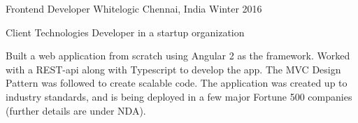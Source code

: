 

\begin{cventries}

  \cventry
    {Frontend Developer} %
    {Whitelogic} %
    {Chennai, India} %
    {Winter 2016} %
    {
      \begin{cvitems} %
      \item {Client Technologies Developer in a startup organization}
        \item {Built a web application from scratch using Angular 2 as the framework.
            Worked with a REST-api along with Typescript to develop the app. The MVC Design 
            Pattern was followed to create scalable code. The application was created up to
            industry standards, and is being deployed in a few major Fortune 500 companies 
            (further details are under NDA).  }
      \end{cvitems}
    }

\end{cventries}
